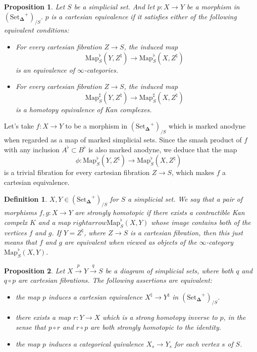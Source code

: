 \documentclass[12pt]{amsart}
\newcommand{\8}{\ensuremath{\infty}}
\newcommand{\SSet}{\ensuremath{\text{Set}_{\boldsymbol{\Delta}}}}
\newcommand{\Map}{\ensuremath{\text{Map}}}
\newtheorem{definition}{Definition}
\newtheorem{proposition}{Proposition}
\begin{document}
{{\begin{proposition}
  Let $S$ be a simplicial set. And let $p: X \rightarrow Y$ be a morphism in $(\SSet^+)_{/S}$. $p$ is a cartesian equivalence if it satisfies either of the following equivalent conditions:
  \begin{itemize}
    \item[(1)] For every cartesian fibration $Z \rightarrow S$, the induced map
          \[\Map^\flat_S(Y, Z^\natural) \rightarrow \Map_S^\flat(X, Z^\natural)\] is an equivalence of \8-categories.
    \item[(2)] For every cartesian fibration $Z \rightarrow S$, the induced map \[\Map^\sharp_S(Y, Z^\natural) \rightarrow \Map_S^\sharp(X, Z^\natural)\] is a homotopy equivalence of Kan complexes.
  \end{itemize}
\end{proposition}

Let's take $f: X \rightarrow Y$ to be a morphism in $(\SSet^+)_{/S}$ which is marked anodyne when regarded as a map of marked simplicial sets. Since the smash product of $f$ with any inclusion $A^\flat\subset B^\flat$ is also marked anodyne, we deduce that the map \[\phi: \Map_S^\flat(Y, Z^\natural) \rightarrow \Map_S^\flat(X, Z^\natural)\] is a trivial fibration for every cartesian fibration $Z \rightarrow S$, which makes $f$ a cartesian equivalence.

\begin{definition}
  $X, Y \in (\SSet^+)_{/S}$ for $S$ a simplicial set. We say that a pair of morphisms $f, g: X \rightarrow Y$ are strongly homotopic if there exists a contractible Kan compelx $K$ and a map $rightarrow \Map^\flat_S(X, Y)$ whose image contains both of the vertices $f$ and $g$. If $Y = Z^\natural$, where $Z \rightarrow S$ is a cartesian fibration, then this just means that $f$ and $g$ are equivalent when viewed as objects of the \8-category $\Map_S^\flat(X, Y)$.
\end{definition}

\begin{proposition}
  Let $X \xrightarrow{p} Y \xrightarrow{q} S$ be a diagram of simplicial sets, where both $q$ and $q\circ p$ are cartesian fibrations. The following assertions are equivalent:
  \begin{itemize}
    \item[(1)] the map $p$ induces a cartesian equivalence $X^\natural \rightarrow Y^\natural$ in $(\SSet^+)_{/S}$.
    \item[(2)] there exists a map $r: Y \rightarrow X$ which is a strong homotopy inverse to $p$, in the sense that $p\circ r$ and $r\circ p$ are both strongly homotopic to the identity.
    \item[(3)] the map $p$ induces a categorical quivalence $X_s \rightarrow Y_s$ for each vertex $s$ of $S$.
  \end{itemize}
\end{proposition}

}}
\end{document}
